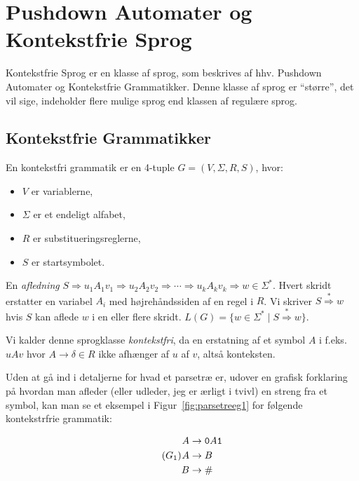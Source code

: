 \chapter{Pushdown Automater og Kontekstfrie Sprog}

Kontekstfrie Sprog er en klasse af sprog, som beskrives af hhv. Pushdown Automater og Kontekstfrie Grammatikker. Denne klasse af sprog er ``større'', det vil sige, indeholder flere mulige sprog end klassen af regulære sprog.

\section{Kontekstfrie Grammatikker}%
\label{sec:label}

\begin{definition}
	En kontekstfri grammatik er en 4-tuple $G = (V, \Sigma, R, S)$, hvor:
	\begin{itemize}
		\item $V$ er variablerne,
		\item $\Sigma$ er et endeligt alfabet,
		\item $R$ er substitueringsreglerne,
		\item $S$ er startsymbolet.
	\end{itemize}
\end{definition}

En \textit{afledning} $S \Rightarrow u_{1}A_{1}v_{1} \Rightarrow u_{2}A_{2}v_{2} \Rightarrow \cdots \Rightarrow u_{k}A_{k}v_{k} \Rightarrow w \in \Sigma^{*}$. Hvert skridt erstatter en variabel $A_{i}$ med højrehåndssiden af en regel i $R$. Vi skriver $S \stackrel{*}{\Rightarrow} w$ hvis $S$ kan aflede $w$ i en eller flere skridt. $L(G) = \{w \in \Sigma^{*} \mid S \stackrel{*}{\Rightarrow} w\}$.

Vi kalder denne sprogklasse \textit{kontekstfri}, da en erstatning af et symbol $A$ i f.eks. $uAv$ hvor $A \rightarrow \delta \in R$ ikke afhænger af $u$ af $v$, altså konteksten.

Uden at gå ind i detaljerne for hvad et parsetræ er, udover en grafisk forklaring på hvordan man afleder (eller udleder, jeg er ærligt i tvivl) en streng fra et symbol, kan man se et eksempel i Figur~\ref{fig:parsetreeg1} for følgende kontekstrfrie grammatik:

\begin{equation}
	\tag{$G_{1}$}
	\begin{split}
		A & \rightarrow \mathtt{0}A \mathtt{1} \\
		A & \rightarrow B                      \\
		B & \rightarrow \mathtt{\#}
	\end{split}
	\label{eqn:G1}
\end{equation}

